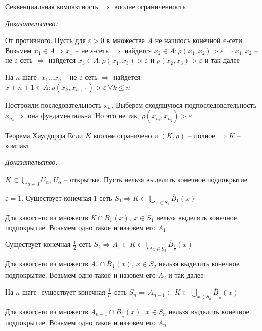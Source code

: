 \documentclass[12pt]{article}
\begin{document}
\begin{theo}{}
    Секвенциальная компактность $\Rightarrow$ вполне ограниченность
\end{theo}

\textit{Доказательство:}

От противного. Пусть для $\varepsilon > 0$ в множестве $A$ не нашлось конечной $\varepsilon$-сети. Возьмем $x_1 \in A \Rightarrow x_1$ -- не $\varepsilon$-сеть $\Rightarrow$ найдется $x_2 \in A : \rho(x_1, x_2) > \varepsilon \Rightarrow x_1, x_2$ -- не $\varepsilon$-сеть $\Rightarrow$ найдется $x_3 \in A : \rho(x_1, x_3) > \varepsilon$ и $\rho(x_2, x_3) > \varepsilon$ и так далее

На $n$ шаге: $x_1 \ldots x_n$ -- не $\varepsilon$-сеть $\Rightarrow$ найдется $x+{n + 1} \in A : \rho(x_k, x_{n + 1}) > \varepsilon\ \forall k \leq n$

Построили последовательность $x_n$. Выберем сходящуюся подпоследовательность $x_{n_k} \Rightarrow$ она фундаментальна. Но это не так, $\rho(x_{n_i}, x_{n_j}) > \varepsilon$

\begin{theo}{Теорема Хаусдорфа}
    Если $K$ вполне ограничено и $(K, \rho)$ -- полное $\Rightarrow K$ -- компакт
\end{theo}

\newpage

\textit{Доказательство:}

$K \subset \bigcup\limits_{\alpha \in I} U_\alpha$, $U_\alpha$ -- открытые. Пусть нельзя выделить конечное подпокрытие 

$\varepsilon = 1$. Существует конечная $1$-сеть $S_1 \Rightarrow K \subset \bigcup\limits_{x \in S_1} \overline{B}_1(x)$

Для какого-то из множеств $K \cap \overline{B}_1(x),\ x \in S_1$ нельзя выделить конечное подпокрытие. Возьмем одно такое и назовем его $A_1$

Существует конечная $\frac{1}{2}$-сеть $S_2 \Rightarrow A_1 \subset K \subset \bigcup\limits_{x \in S_2} \overline{B}_{\frac{1}{2}}(x)$

Для какого-то из множеств $A_1 \cap \overline{B}_{\frac{1}{2}}(x),\ x \in S_2$ нельзя выделить конечное подпокрытие. Возьмем одно такое и назовем его $A_2$ и так далее

На $n$ шаге: существует конечная $\frac{1}{n}$-сеть $S_n \Rightarrow A_{n - 1} \subset K \subset \bigcup\limits_{x \in S_n} \overline{B}_{\frac{1}{n}}(x)$

Для какого-то из множеств $A_{n - 1} \cap \overline{B}_{\frac{1}{n}}(x),\ x \in S_n$ нельзя выделить конечное подпокрытие. Возьмем одно такое и назовем его $A_n$
\end{document}
